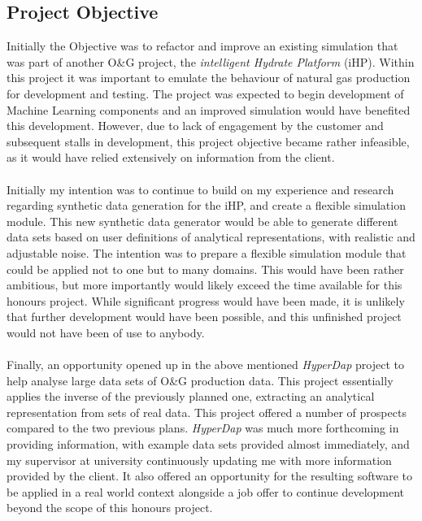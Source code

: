 \documentclass[main.tex]{subfiles}
\begin{document}
    \subsection{Project Objective}
  
      Initially the Objective was to refactor and improve an existing simulation that was part of another O\&G  project, the \textit{intelligent Hydrate Platform} (iHP). Within this project it was important to emulate the behaviour of natural gas production for development and testing. The project was expected to begin development of Machine Learning components and an improved simulation would have benefited this development. However, due to lack of engagement by the customer and subsequent stalls in development, this project objective became rather infeasible, as it would have relied extensively on information from the client.
      \\\\
      Initially my intention was to continue to build on my experience and research regarding synthetic data generation for the iHP, and create a flexible simulation module. This new synthetic data generator would be able to generate different data sets based on user definitions of analytical representations, with realistic and adjustable noise. The intention was to prepare a flexible simulation module that could be applied not to one but to many domains. This would have been rather ambitious, but more importantly would likely exceed the time available for this honours project. While significant progress would have been made, it is unlikely that further development would have been possible, and this unfinished project would not have been of use to anybody.
      \\\\
      Finally, an opportunity opened up in the above mentioned \textit{HyperDap} project to help analyse large data sets of O\&G production data. This project essentially applies the inverse of the previously planned one, extracting an analytical representation from sets of real data. This project offered a number of prospects compared to the two previous plans. \textit{HyperDap} was much more forthcoming in providing information, with example data sets provided almost immediately, and my supervisor at university continuously updating me with more information provided by the client. It also offered an opportunity for the resulting software to be applied in a real world context alongside a job offer to continue development beyond the scope of this honours project.
    
\end{document}
